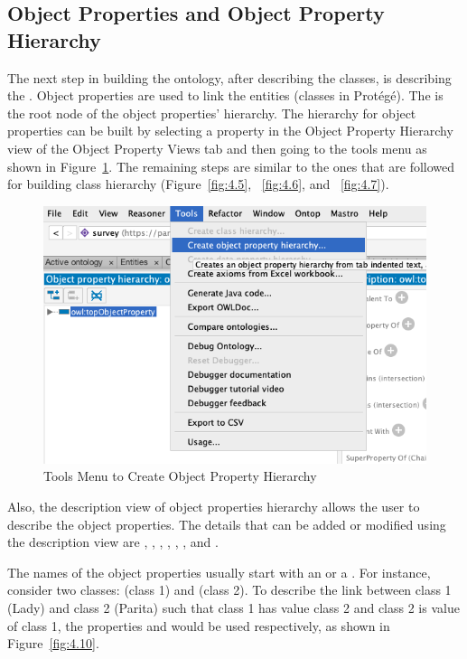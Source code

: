 \begin{doublespace}
\subsection{Object Properties and Object Property Hierarchy}
\par The next step in building the ontology, after describing the classes, is describing the . Object properties are used to link the entities (classes in Protégé). The  is the root node of the object properties' hierarchy. The hierarchy for object properties can be built by selecting a property in the Object Property Hierarchy view of the Object Property Views tab and then going to the tools menu as shown in Figure~\ref{fig:4.9}. The remaining steps are similar to the ones that are followed for building class hierarchy (Figure~\ref{fig:4.5}, ~\ref{fig:4.6}, and ~\ref{fig:4.7}).
\begin{figure}[htp]
    \centering
    \includegraphics[width=15cm]{images/ch4/Figure9.png}
    \caption{Tools Menu to Create Object Property Hierarchy}
    \label{fig:4.9}
\end{figure}
\par Also, the description view of object properties hierarchy allows the user to describe the object properties. The details that can be added or modified using the description view are , , , , , , and . 
\par The names of the object properties usually start with an  or a . For instance, consider two classes:  (class 1) and  (class 2). To describe the link between class 1 (Lady) and class 2 (Parita) such that class 1 has value class 2 and class 2 is value of class 1, the properties  and  would be used respectively, as shown in Figure~\ref{fig:4.10}. 

\end{doublespace}
